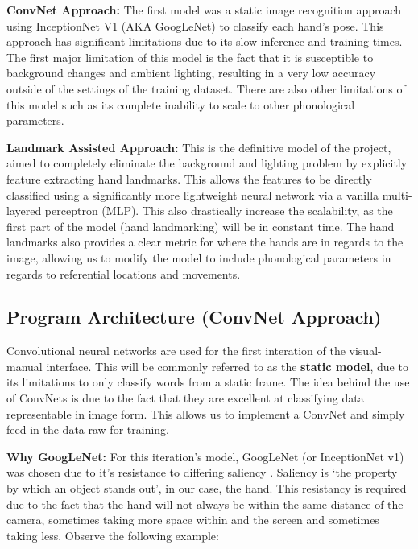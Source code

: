\documentclass[11pt]{article}
\def\paraskip{\vskip 0.4cm}
\begin{document}
        \paraskip

        \noindent\textbf{ConvNet Approach: } The first model was a static image recognition approach using InceptionNet V1 (AKA GoogLeNet) to classify each hand's pose. This approach has significant limitations due to its slow inference and training times. The first major limitation of this model is the fact that it is susceptible to background changes and ambient lighting, resulting in a very low accuracy outside of the settings of the training dataset. There are also other limitations of this model such as its complete inability to scale to other phonological parameters.

        \paraskip

        \noindent\textbf{Landmark Assisted Approach: } This is the definitive model of the project, aimed to completely eliminate the background and lighting problem by explicitly feature extracting hand landmarks. This allows the features to be directly classified using a significantly more lightweight neural network via a vanilla multi-layered perceptron (MLP). This also drastically increase the scalability, as the first part of the model (hand landmarking) will be in constant time. The hand landmarks also provides a clear metric for where the hands are in regards to the image, allowing us to modify the model to include phonological parameters in regards to referential locations and movements.

    \subsection{Program Architecture (ConvNet Approach)}
        Convolutional neural networks are used for the first interation of the visual-manual interface. This will be commonly referred to as the \textbf{static model}, due to its limitations to only classify words from a static frame. The idea behind the use of ConvNets is due to the fact that they are excellent at classifying data representable in image form. This allows us to implement a ConvNet and simply feed in the data raw for training. 
        
        \paraskip

        \noindent\textbf{Why GoogLeNet: } For this iteration's model, GoogLeNet (or InceptionNet v1) was chosen due to it's resistance to differing saliency \cite{inception}. Saliency is `the property by which an object stands out', in our case, the hand. This resistancy is required due to the fact that the hand will not always be within the same distance of the camera, sometimes taking more space within and the screen and sometimes taking less. Observe the following example:
\end{document}
